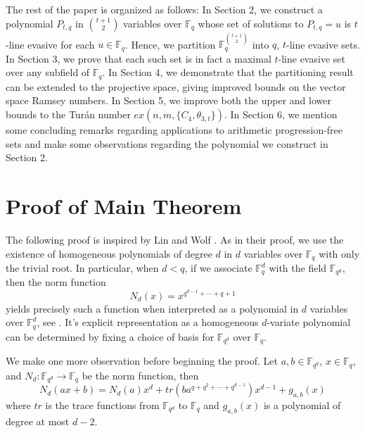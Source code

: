 \documentclass[12pt]{article}
\newcommand{\F}{\mathbb{F}}
\begin{document}
The rest of the paper is organized as follows: In Section 2, we construct a polynomial $P_{t, q}$ in $\binom{t+1}{2}$ variables over $\F_q$ whose set of solutions to $P_{t, q} = u$ is $t$-line evasive for each $u \in \F_q$. Hence, we partition $\F_q^{\binom{t+1}{2}}$ into $q$, $t$-line evasive sets. In Section 3, we prove that each such set is in fact a maximal $t$-line evasive set over any subfield of $\F_q$. In Section 4, we demonstrate that the partitioning result can be extended to the projective space, giving improved bounds on the vector space Ramsey numbers.  In Section 5, we improve both the upper and lower bounds to the Tur\'{a}n number $ex(n, m, \{ C_4, \theta_{3, t}\})$. In Section 6, we mention some concluding remarks regarding applications to arithmetic progression-free sets and make some observations regarding the polynomial we construct in Section 2.


\section{Proof of Main Theorem}
The following proof is inspired by Lin and Wolf \cite[Proposition~3]{LW}. As in their proof, we use the existence of homogeneous polynomials of degree $d$ in $d$ variables over $\mathbb{F}_q$ with only the trivial root. In particular, when $d < q$, if we associate $\F_q^d$ with the field $\F_{q^d}$, then the norm function 
$$
N_d(x) = x^{q^{d-1} + \cdots + q + 1}
$$
yields precisely such a function when interpreted as a polynomial in $d$ variables over $\F_q^d$, see \cite[page 6]{borevich1986number}. 
It's explicit representation as a homogeneous $d$-variate polynomial can be determined by fixing a choice of basis for $\F_{q^d}$ over $\F_q$. 

We make one more observation before beginning the proof. Let $a, b \in \F_{q^d}$, $x \in \F_q$, and $N_d:\F_{q^d} \rightarrow \F_q$ be the norm function, then 
\begin{equation}\label{NormExpand}
N_d(ax + b) = N_d(a)x^d + tr(ba^{q + q^2 + \cdots +q^{d-1}})x^{d-1} + g_{a, b}(x)    
\end{equation}
where $tr$ is the trace functions from $\F_{q^d}$ to $\F_q$ and $g_{a, b}(x)$ is a polynomial of degree at most $d-2$. 
\end{document}
